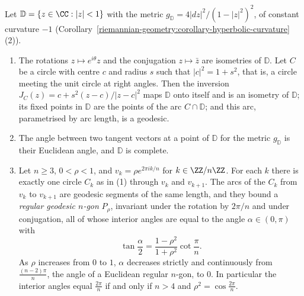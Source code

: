 \begin{lemma}\label{riemannian-geometry:lemma-regular-polygons}
Let $\mathbb{D} = \{z \in \CC : |z| < 1\}$ with the metric $g_{\mathbb{D}} = 4|dz|^2/(1 - |z|^2)^2$, of constant curvature $-1$
(Corollary~\ref{riemannian-geometry:corollary-hyperbolic-curvature}(2)).
\begin{enumerate}
\item The rotations $z \mapsto e^{i\theta}z$ and the conjugation $z \mapsto \bar z$ are isometries of $\mathbb{D}$. Let $C$ be a circle with centre $c$ and radius $s$ such that $|c|^2 = 1 + s^2$, that is, a
circle meeting the unit circle at right angles. Then the inversion $J_C(z) = c + s^2(z - c)/|z - c|^2$ maps $\mathbb{D}$ onto itself and is an isometry of $\mathbb{D}$; its fixed points in $\mathbb{D}$ are the
points of the arc $C \cap \mathbb{D}$; and this arc, parametrised by arc length, is a geodesic.
\item The angle between two tangent vectors at a point of $\mathbb{D}$ for the metric $g_{\mathbb{D}}$ is their Euclidean angle, and $\mathbb{D}$ is complete.
\item Let $n \geq 3$, $0 < \rho < 1$, and $v_k = \rho e^{2\pi ik/n}$ for $k \in \ZZ/n\ZZ$. For each $k$ there is exactly one circle $C_k$ as in (1) through $v_k$ and $v_{k+1}$. The arcs of the $C_k$
from $v_k$ to $v_{k+1}$ are geodesic segments of the same length, and they bound a \emph{regular geodesic $n$-gon} $P_\rho$, invariant under the rotation by $2\pi/n$ and under conjugation, all of whose
interior angles are equal to the angle $\alpha \in (0, \pi)$ with
\[
\tan\frac{\alpha}{2} = \frac{1 - \rho^2}{1 + \rho^2}\cot\frac{\pi}{n} .
\]
As $\rho$ increases from $0$ to $1$, $\alpha$ decreases strictly and continuously from $\frac{(n - 2)\pi}{n}$, the angle of a Euclidean regular $n$-gon, to $0$. In particular the interior angles equal
$\frac{2\pi}{n}$ if and only if $n > 4$ and $\rho^2 = \cos\frac{2\pi}{n}$.
\end{enumerate}
\end{lemma}

